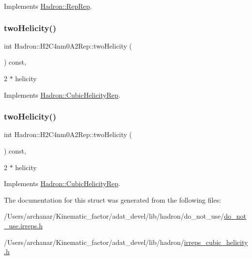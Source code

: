 Implements \mbox{\hyperlink{structHadron_1_1RepRep_ab3213025f6de249f7095892109575fde}{Hadron\+::\+Rep\+Rep}}.

\mbox{\label{structHadron_1_1H2C4nm0A2Rep_a30b35f728294aa3dc99c1186ca21775e}} 
\subsubsection{\texorpdfstring{twoHelicity()}{twoHelicity()}\hspace{0.1cm}{\footnotesize\ttfamily [1/2]}}
{\footnotesize\ttfamily int Hadron\+::\+H2\+C4nm0\+A2\+Rep\+::two\+Helicity (\begin{DoxyParamCaption}{ }\end{DoxyParamCaption}) const\hspace{0.3cm}{\ttfamily [inline]}, {\ttfamily [virtual]}}

2 $\ast$ helicity 

Implements \mbox{\hyperlink{structHadron_1_1CubicHelicityRep_af507aa56fc2747eacc8cb6c96db31ecc}{Hadron\+::\+Cubic\+Helicity\+Rep}}.

\mbox{\label{structHadron_1_1H2C4nm0A2Rep_a30b35f728294aa3dc99c1186ca21775e}} 
\subsubsection{\texorpdfstring{twoHelicity()}{twoHelicity()}\hspace{0.1cm}{\footnotesize\ttfamily [2/2]}}
{\footnotesize\ttfamily int Hadron\+::\+H2\+C4nm0\+A2\+Rep\+::two\+Helicity (\begin{DoxyParamCaption}{ }\end{DoxyParamCaption}) const\hspace{0.3cm}{\ttfamily [inline]}, {\ttfamily [virtual]}}

2 $\ast$ helicity 

Implements \mbox{\hyperlink{structHadron_1_1CubicHelicityRep_af507aa56fc2747eacc8cb6c96db31ecc}{Hadron\+::\+Cubic\+Helicity\+Rep}}.



The documentation for this struct was generated from the following files\+:\begin{DoxyCompactItemize}
\item 
/\+Users/archanar/\+Kinematic\+\_\+factor/adat\+\_\+devel/lib/hadron/do\+\_\+not\+\_\+use/\mbox{\hyperlink{do__not__use_8irreps_8h}{do\+\_\+not\+\_\+use.\+irreps.\+h}}\item 
/\+Users/archanar/\+Kinematic\+\_\+factor/adat\+\_\+devel/lib/hadron/\mbox{\hyperlink{lib_2hadron_2irreps__cubic__helicity_8h}{irreps\+\_\+cubic\+\_\+helicity.\+h}}\end{DoxyCompactItemize}
